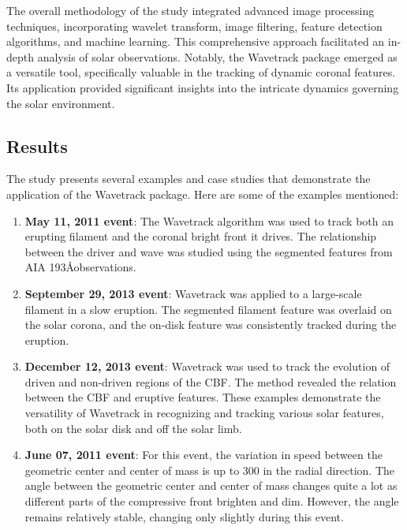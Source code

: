 The overall methodology of the study integrated advanced image processing techniques, incorporating wavelet transform, image filtering, feature detection algorithms, and machine learning. This comprehensive approach facilitated an in-depth analysis of solar observations. Notably, the Wavetrack package emerged as a versatile tool, specifically valuable in the tracking of dynamic coronal features. Its application provided significant insights into the intricate dynamics governing the solar environment.

\subsection{Results}
The study presents several examples and case studies that demonstrate the application of the Wavetrack package. Here are some of the examples mentioned:

\begin{enumerate}
	\item \textbf{May 11, 2011 event}:
	The Wavetrack algorithm was used to track both an erupting filament and the coronal bright front it drives. The relationship between the driver and wave was studied using the segmented features from AIA 193\AA observations.
	
	\item \textbf{September 29, 2013 event}: Wavetrack was applied to a large-scale filament in a slow eruption. The segmented filament feature was overlaid on the solar corona, and the on-disk feature was consistently tracked during the eruption.
	
	\item \textbf{December 12, 2013 event}: Wavetrack was used to track the evolution of driven and non-driven regions of the CBF. The method revealed the relation between the CBF and eruptive features. These examples demonstrate the versatility of Wavetrack in recognizing and tracking various solar features, both on the solar disk and off the solar limb.
	
	\item \textbf{June 07, 2011 event}: For this event, the variation in speed between the geometric center and center of mass is up to 300 \kms in the radial direction. The angle between the geometric center and center of mass changes quite a lot as different parts of the compressive front brighten and dim. However, the angle remains relatively stable, changing only slightly during this event.
\end{enumerate}

